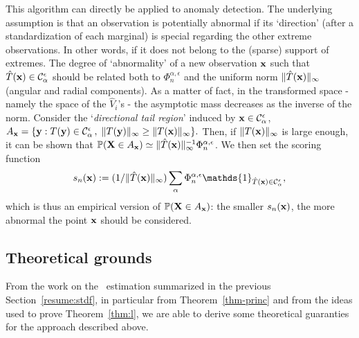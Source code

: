 This algorithm can directly be applied to anomaly detection.
The underlying assumption is that an
observation is potentially abnormal if its `direction' (after a standardization of each marginal) is special
regarding the other extreme observations. In other words, if it
does not belong to the (sparse) support of
extremes.
The degree of `abnormality' of a new observation $\mathbf x$ such that
$\hat T(\mathbf x) \in \mathcal{C}_\alpha^\epsilon$ %
should be related both to $\Phi_n^{\alpha, \epsilon}$ and the uniform
norm $\|\hat T(\mathbf x)\|_\infty$ (angular and radial
components). As a matter of fact, in the transformed space - namely the
space of the $\hat V_i$'s - the asymptotic mass decreases as the
inverse of the norm.
Consider the  `\textit{directional tail region}' induced by $\mathbf x \in \mathcal{C}_\alpha^\epsilon$, 
$A_{\mathbf x} =  \{\mathbf y  :
T(\mathbf y) \in \mathcal{C}_\alpha^\epsilon\,,\;\|T(\mathbf y)\|_\infty \ge \|
T(\mathbf x)\|_\infty\}.$
 Then, if  $\|T(\mathbf x)\|_\infty$ is large enough, it can be shown that 
$  \mathbb{P}( \mathbf X \in A_{\mathbf x} ) \simeq  \|\hat T(\mathbf x) \|_\infty^{-1} \Phi_n^{\alpha,\epsilon} $.
We then set the scoring function $$s_n(\mb x):= (1/\|\hat T(\mb x)\|_\infty) \sum_{\alpha }\Phi_n^{\alpha, \epsilon} \mathds{1}_{\hat T(\mb x) \in \mathcal{C}_\alpha^\epsilon},$$
which is thus an empirical version of
$\mathbb{P}(\mathbf X\in A_{\mathbf x})$: the smaller $s_n(\mathbf x)$, the more abnormal the point $\mathbf x$ should be considered.


\subsection{Theoretical grounds}

From the work on the \stdf~estimation summarized in the previous Section~\ref{resume:stdf}, in particular from Theorem~\ref{thm-princ} and from the ideas used to prove Theorem~\ref{thm:l}, we are able to derive some theoretical guaranties for the approach described above. %

